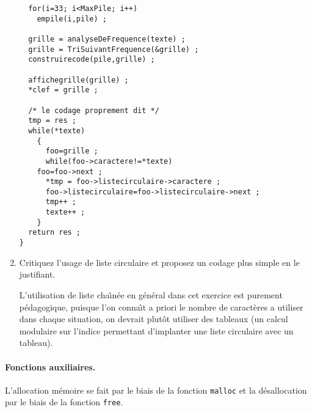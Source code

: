 \begin{enumerate}
\begin{correction}
\begin{verbatim}
  for(i=33; i<MaxPile; i++)
    empile(i,pile) ;

  grille = analyseDeFrequence(texte) ;
  grille = TriSuivantFrequence(&grille) ;
  construirecode(pile,grille) ;

  affichegrille(grille) ;
  *clef = grille ;

  /* le codage proprement dit */
  tmp = res ;
  while(*texte)
    {
      foo=grille ;
      while(foo->caractere!=*texte)
	foo=foo->next ;
      *tmp = foo->listecirculaire->caractere ;
      foo->listecirculaire=foo->listecirculaire->next ;
      tmp++ ;
      texte++ ;
    }
  return res ;
}
\end{verbatim}
  \end{correction}
\fi
\item Critiquez l'usage de liste circulaire et proposez un codage plus
  simple en le justifiant.
\ifcorrection
  \begin{correction}
    L'utilisation de liste cha\^\i{}n\'ee en g\'en\'eral dans cet
    exercice est purement p\'edagogique, puisque l'on conna\^\i{}t a
    priori le nombre de caract\`eres a utiliser dans chaque situation,
    on devrait plut\^ot utiliser des tableaux (un calcul modulaire sur
    l'indice permettant d'implanter une liste circulaire avec un
    tableau).
  \end{correction}
\fi
\end{enumerate}
\paragraph{Fonctions auxiliaires.} 
L'allocation m\'emoire se fait par le biais de la fonction
\texttt{malloc} et la d\'esallocation par le biais de la fonction
\texttt{free}.

